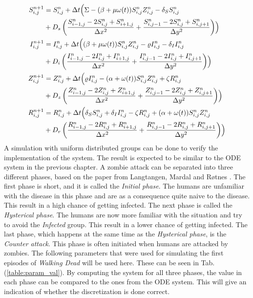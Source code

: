 \documentclass[%
twoside,                 %
final,                   %
10pt]{article}
\begin{document}
\begin{equation} \label{eq:SIZR_disc2}
	\begin{aligned}
    S^{n+1}_{i,j} &= S^n_{i,j} + \Delta t \Bigl( \Sigma - (\beta+\mu \omega(t))S^{n}_{i,j}Z^{n}_{i,j}- \delta_S S^{n}_{i,j} \\
        &+ D_s\left(\frac{S^{n}_{i-1,j}-2S^{n}_{i,j}+S^{n}_{i+1,j}}{\Delta x^2}+\frac{S^{n}_{i,j-1}-2S^{n}_{i,j}+S^{n}_{i,j+1}}{\Delta y^2}\right)\Bigr) \\
    I^{n+1}_{i,j} &= I^n_{i,j} + \Delta t \Bigl((\beta+\mu \omega(t))S^{n}_{i,j}Z^{n}_{i,j}-\varrho I^{n}_{i,j}- \delta_I I^{n}_{i,j} \\
        &+ D_i\left(\frac{I^{n}_{i-1,j}-2I^{n}_{i,j}+I^{n}_{i+1,j}}{\Delta x^2}+\frac{I^{n}_{i,j-1}-2I^{n}_{i,j}+I^{n}_{i,j+1}}{\Delta y^2}\right)\Bigr) \\ 
    Z^{n+1}_{i,j} &= Z^n_{i,j} +\Delta t \Bigl( \varrho I^{n}_{i,j}-(\alpha+\omega(t))S^{n}_{i,j}Z^{n}_{i,j}+ \zeta R^{n}_{i,j} \\
        &+D_z\left(\frac{Z^{n}_{i-1,j}-2Z^{n}_{i,j}+Z^{n}_{i+1,j}}{\Delta x^2}+\frac{Z^{n}_{i,j-1}-2Z^{n}_{i,j}+Z^{n}_{i,j+1}}{\Delta y^2}\right)\Bigr) \\
    R^{n+1}_{i,j} &= R^n_{i,j} +\Delta t \Bigl(\delta_S S^{n}_{i,j}+\delta_I I^{n}_{i,j}-\zeta R^{n}_{i,j}+(\alpha+\omega(t))S^{n}_{i,j}Z^{n}_{i,j} \\
        &+D_r\left(\frac{R^{n}_{i-1,j}-2R^{n}_{i,j}+R^{n}_{i+1,j}}{\Delta x^2}+\frac{R^{n}_{i,j-1}-2R^{n}_{i,j}+R^{n}_{i,j+1}}{\Delta y^2}\right)\Bigr) 
	\end{aligned}
\end{equation}
A simulation with uniform distributed groups can be done to verify the implementation of the system. The result is expected to be similar to the ODE system in the previous chapter. A zombie attack can be separated into three different phases, based on the paper from Langtangen, Mardal and Røtnes \cite{zombie-math}. The first phase is short, and it is called the \emph{Initial phase}. The humans are unfamiliar with the disease in this phase and are as a consequence quite naive to the disease. This result in a high chance of getting infected. The next phase is called the \emph{Hysterical phase}. The humans are now more familiar with the situation and try to avoid the \emph{Infected} group. This result in a lower chance of getting infected. The last phase, which happens at the same time as the \emph{Hysterical phase}, is the \emph{Counter attack}. This phase is often initiated when humans are attacked by zombies. The following parameters that were used for simulating the first episodes of \emph{Walking Dead} will be used here. These can be seen in Tab.(\ref{table:param_val}). By computing the system for all three phases, the value in each phase can be compared to the ones from the ODE system. This will give an indication of whether the discretization is done correct. 
\end{document}
